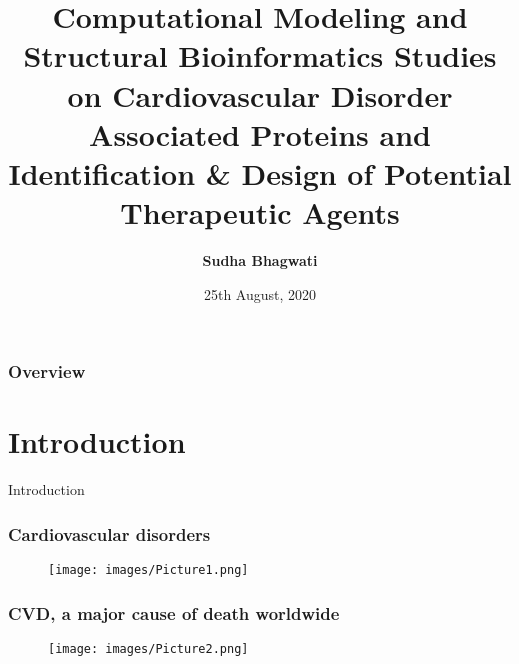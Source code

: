 \documentclass{beamer}
\title[PhD Oral Defense]{Computational Modeling and Structural Bioinformatics Studies on Cardiovascular Disorder Associated Proteins and Identification \& Design of Potential Therapeutic Agents} %
\author{\textbf{Sudha Bhagwati}} %
\institute[CSIR-CDRI, JNU] %
{
\small \textbf{Supervisor:}  Dr. Mohammad Imran Siddiqi (\emph{Sr. Principal Scientist}) \\ \vspace{0.5cm}
\small CSIR-Central Drug Research Institute \\ %
\medskip
Jawaharlal Nehru University, New Delhi \\ %
\medskip
\textit{sudhabhagwati@gmail.com} %
}
\date{25th August, 2020} %
\begin{document}
\begin{frame}
\titlepage %
\end{frame}

\begin{frame}
\frametitle{Overview} %
\tableofcontents %
\end{frame}


\section{Introduction}

\begin{frame}
\begin{block}
\Huge{\centerline{Introduction}}
\end{block}
\end{frame}

\begin{frame}
\frametitle{\textbf{Cardiovascular disorders}}
\begin{figure}
\texttt{[image: images/Picture1.png]}
\end{figure}
\end{frame}

\begin{frame}
\frametitle{\textbf{CVD, a major cause of death worldwide}}
\begin{figure}
\texttt{[image: images/Picture2.png]}
\end{figure}
\end{frame}
\end{document}
